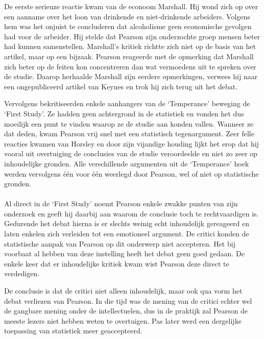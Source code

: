 \documentclass[a4paper,11pt]{article}
\begin{document}
De eerste serieuze reactie kwam van de econoom Marshall. Hij wond zich op over
een aanname over het loon van drinkende en niet-drinkende arbeiders. Volgens
hem was het onjuist te concluderen dat alcoholisme geen economische gevolgen
had voor de arbeider. Hij stelde dat Pearson zijn onderzochte groep mensen
beter had kunnen samenstellen. Marshall's kritiek richtte zich niet op de
basis van het artikel, maar op een bijzaak. Pearson reageerde met de opmerking
dat Marshall zich beter op de feiten kon concentreren dan wat vermoedens uit
te spreken over de studie. Daarop herhaalde Marshall zijn eerdere opmerkingen,
verwees hij naar een ongepubliceerd artikel van Keynes en trok hij zich terug
uit het debat.

Vervolgens bekritiseerden enkele aanhangers van de `Temperance' beweging de
`First Study'. Ze hadden geen achtergrond in de statistiek en vonden het dus
moeilijk een punt te vinden waarop ze de studie aan konden vallen. Wanneer ze
dat deden, kwam Pearson vrij snel met een statistisch tegenargument. Zeer
felle reacties kwamen van Horsley en door zijn vijandige houding lijkt het
erop dat hij vooral uit overtuiging de conclusies van de studie veroordeelde
en niet zo zeer op inhoudelijke gronden. Alle verschillende argumenten uit de
`Temperance' hoek werden vervolgens \'e\'en voor \'e\'en weerlegd door
Pearson, wel of niet op statistische gronden.

\paragraph{}

Al direct in de `First Study' noemt Pearson enkele zwakke punten van zijn
onderzoek en geeft hij daarbij aan waarom de conclusie toch te rechtvaardigen
is. Gedurende het debat hierna is er slechts weinig echt inhoudelijk
gereageerd en laten enkelen zich verleiden tot een emotioneel argument. De
critici konden de statistische aanpak van Pearson op dit onderwerp niet
accepteren. Het bij voorbaat al hebben van deze instelling heeft het debat
geen goed gedaan. De enkele keer dat er inhoudelijke kritiek kwam wist Pearson
deze direct te verdedigen.

De conclusie is dat de critici niet alleen inhoudelijk, maar ook qua vorm het
debat verliezen van Pearson. In die tijd was de mening van de critici echter
wel de gangbare mening onder de intellectuelen, dus in de praktijk zal Pearson
de meeste lezers niet hebben weten te overtuigen. Pas later werd een
dergelijke toepassing van statistiek meer geaccepteerd.
\end{document}
